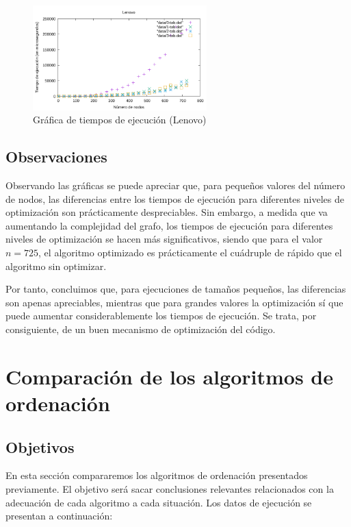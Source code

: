 \documentclass{homework}
\begin{document}
    \begin{figure}[H]
        \centering
        \includegraphics[width=0.6\textwidth]{../data/lenovo-opt.pdf}
        \caption{Gráfica de tiempos de ejecución (Lenovo)}
    \end{figure}

    \vspace{3cm}

    \subsection{Observaciones}

    Observando las gráficas se puede apreciar que, para pequeños valores del número de nodos, las diferencias entre los
    tiempos de ejecución para diferentes niveles de optimización son prácticamente despreciables. Sin embargo, a medida
    que va aumentando la complejidad del grafo, los tiempos de ejecución para diferentes niveles de optimización se hacen
    más significativos, siendo que para el valor $n=725$, el algoritmo optimizado es prácticamente el cuádruple de rápido que
    el algoritmo sin optimizar. 

    Por tanto, concluimos que, para ejecuciones de tamaños pequeños, las diferencias son apenas apreciables, mientras que
    para grandes valores la optimización sí que puede aumentar considerablemente los tiempos de ejecución. Se trata, por
    consiguiente, de un buen mecanismo de optimización del código. 

    \newpage
    \section{Comparación de los algoritmos de ordenación}

    \subsection{Objetivos}

    En esta sección compararemos los algoritmos de ordenación presentados previamente. El objetivo será
    sacar conclusiones relevantes relacionados con la adecuación de cada algoritmo a cada situación. Los datos de ejecución
    se presentan a continuación:
\end{document}
